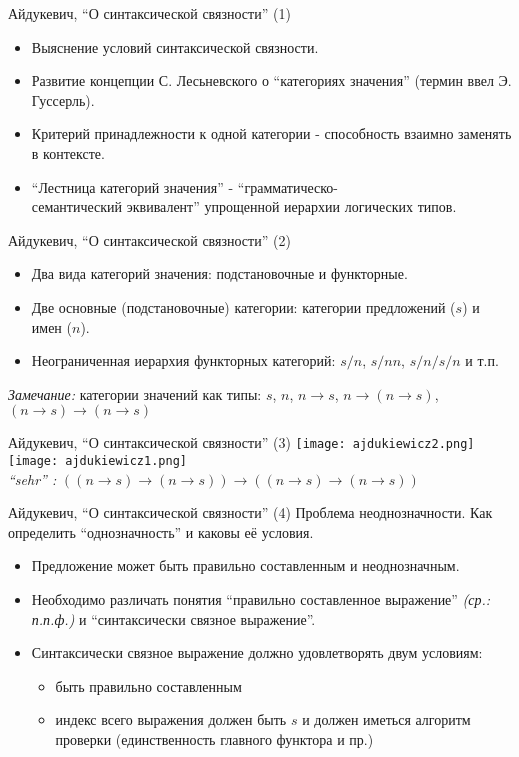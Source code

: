 \documentclass{beamer}
\begin{document}
\begin{frame}{Айдукевич, ``О синтаксической связности'' (1)}
\begin{itemize}
  \item Выяснение условий синтаксической связности.
  \item Развитие концепции С. Лесьневского о ``категориях значения'' (термин ввел Э. Гуссерль).
  \item Критерий принадлежности к одной категории - способность взаимно заменять в контексте.
  \item ``Лестница категорий значения'' - ``грамматическо-\\семантический эквивалент'' упрощенной иерархии логических типов.
\end{itemize}
\end{frame}

\begin{frame}{Айдукевич, ``О синтаксической связности'' (2)}
\begin{itemize}
  \item Два вида категорий значения: подстановочные и функторные.
  \item Две основные (подстановочные) категории: категории предложений ($s$) и имен ($n$).
  \item Неограниченная иерархия функторных категорий: $s/n$, $s/nn$, $s/n/s/n$  и т.п.
\end{itemize}
\bigskip
\textit{Замечание:} категории значений как типы: $s$, $n$, $n \to s$, $n \to (n \to s)$, $(n \to s) \to (n \to s)$
\end{frame}

\begin{frame}{Айдукевич, ``О синтаксической связности'' (3)}
\texttt{[image: ajdukiewicz2.png]}\\
\bigskip
\texttt{[image: ajdukiewicz1.png]}\\
\bigskip
\textit{``sehr'' :} $((n \to s) \to (n \to s)) \to ((n \to s) \to (n \to s))$
\end{frame}

\begin{frame}{Айдукевич, ``О синтаксической связности'' (4)}
Проблема неоднозначности. Как определить ``однозначность'' и каковы её условия.\\
\bigskip
\begin{itemize}
  \item Предложение может быть правильно составленным и неоднозначным.
  \item Необходимо различать понятия ``правильно составленное выражение'' \textit{(ср.: п.п.ф.)} и ``синтаксически связное выражение''.
  \item Синтаксически связное выражение должно удовлетворять двум условиям:
    \begin{itemize}
      \item быть правильно составленным 
      \item индекс всего выражения должен быть $s$ и должен иметься алгоритм проверки (единственность главного функтора и пр.)
    \end{itemize}
\end{itemize}
\end{frame}
\end{document}
